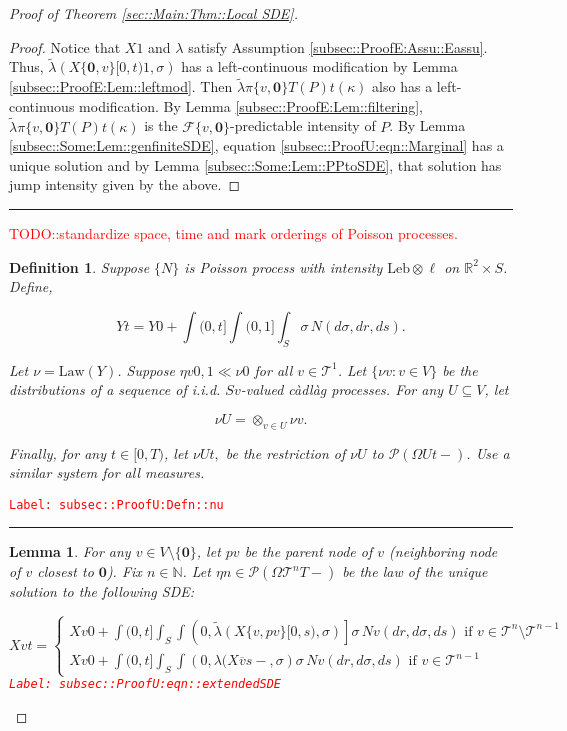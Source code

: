 \documentclass[12pt]{article}
\newcommand{\mb}{\mathbb}
\newcommand{\mc}{\mathcal}
\newcommand{\ov}{\overline}
\newcommand{\te}{\text}
\newcommand{\tr}{\textcolor{red}}
\newcommand{\labe}[1]{\tr{\texttt{Label: #1}}}
\newcommand{\lin}{\rule{\linewidth}{0.4 pt}}
\newcommand{\pmsr}{\mc{P}}							%
\renewcommand{\root}{\mathbf{0}}				%
\renewcommand{\v}{v}							%
\renewcommand{\U}{U}							%
\renewcommand{\S}{S}							%
\newcommand{\s}{\sigma}							%
\newcommand{\T}{T}								%
\renewcommand{\t}{t}							%
\newcommand{\proj}{\pi}							%
\renewcommand{\tt}{s}							%
\newcommand{\F}{\mc{F}}							%
\newcommand{\X}{X}								%
\newcommand{\cl}{\ov}							%
\newcommand{\tree}{\mc{T}}						%
\newcommand{\sln}[1]{^{#1}}						%
\newcommand{\poiss}{N}							%
\newcommand{\leb}{\te{Leb}}						%
\newcommand{\Sm}{\ell}							%
\newcommand{\rate}{\lambda}						%
\renewcommand{\r}{r}							%
\newcommand{\alt}[1]{\widetilde{#1}}			%
\newcommand{\mm}{\nu}							%
\newcommand{\mmm}{\eta}							%
\newcommand{\law}{\te{Law}}						%
\newcommand{\XX}{Y}								%
\renewcommand{\mark}{\kappa}					%
\newcommand{\rp}{P}								%
\newcommand{\crate}{\alt{\lambda}}				%
\newcommand{\p}{p}								%
\newtheorem{lem}[thms]{Lemma}
\newtheorem{defn}[thms]{Definition}
\begin{document}
\begin{proof}[Proof of Theorem \ref{sec::Main:Thm::Local SDE}]
\begin{proof}
Notice that \(\X{}{}{1}\) and \(\rate{}\) satisfy Assumption \ref{subsec::ProofE:Assu::Eassu}. Thus, \(\crate{}{}(\X{\{\root,\v\}}{[0,\t)}{1},\s)\) has a left-continuous modification by Lemma \ref{subsec::ProofE:Lem::leftmod}. Then \(\crate{\proj{\{\v,\root\}}{\T}(\rp{})}{\t}(\mark{})\) also has a left-continuous modification. By Lemma \ref{subsec::ProofE:Lem::filtering}, \(\crate{\proj{\{\v,\root\}}{\T}(\rp{})}{\t}(\kappa)\) is the \(\F{\{\v,\root\}}{}\)-predictable intensity of \(\rp{}\). By Lemma \ref{subsec::Some:Lem::genfiniteSDE}, equation \eqref{subsec::ProofU:eqn::Marginal} has a unique solution and by Lemma \ref{subsec::Some:Lem::PPtoSDE}, that solution has jump intensity given by the above.

\end{proof}

\lin

\tr{TODO::standardize space, time and mark orderings of Poisson processes.}

\begin{defn}
Suppose \(\{\poiss{}\}\) is Poisson process with intensity \(\leb\otimes \Sm\) on \(\mb{R}^2\times \S\). Define,

\[\XX{}{\t} = \XX{}{0} + \int{(0,\t]}\int{(0,1]}\int_\S\s\,\poiss{}(d\s,d\r,d\tt).\]

Let \(\mm{}{}{} = \law(\XX{}{})\). Suppose \(\mmm{\v}{0,}{1}\ll\mm{}{0}{}\) for all \(\v\in\tree\sln{1}\). Let \(\{\mm{\v}{}{}:\v\in V\}\) be the distributions of a sequence of i.i.d. \(\S{\v}\)-valued c\`adl\`ag processes. For any \(\U\subseteq V\), let 

\[\mm{\U}{}{} = \otimes_{\v\in\U} \mm{\v}{}{}.\]

Finally, for any \(\t\in [0,\T)\), let \(\mm{\U}{\t,}{}\) be the restriction of \(\mm{\U}{}{}\) to \(\pmsr(\Omega{\U}{\t-})\). Use a similar system for all measures.
\label{subsec::ProofU:Defn::nu}
\end{defn}
\labe{subsec::ProofU:Defn::nu}

\lin

\begin{lem}
For any \(\v \in V\setminus\{\root\}\), let \(\p{\v}\) be the parent node of \(\v\) (neighboring node of \(\v\) closest to \(\root\)). Fix \(n \in \mb{N}\). Let \(\mmm{}{}{n} \in \pmsr\left(\Omega{\tree\sln{n}}{\T-}\right)\) be the law of the unique solution to the following SDE:

\begin{equation}
\X{\v}{\t} = \begin{cases}
\X{\v}{0} + \int{(0,\t]}\int_\S\int{\left(0,\crate{}{}(\X{\{\v,\p{\v}\}}{[0,\tt)},\s)\right]}\s\,\poiss{\v}(d\r,d\s,d\tt)\te{ if } \v \in \tree\sln{n}\setminus \tree\sln{n-1}\\
\X{\v}{0} + \int{(0,\t]}\int_\S\int{\left(0,\rate{}(\X{\cl{\v}}{\tt-},\s\right)}\s\,\poiss{\v}(d\r,d\s,d\tt)\te{ if } \v \in \tree\sln{n-1}
\end{cases}
\label{subsec::ProofU:eqn::extendedSDE}
\end{equation}
\labe{subsec::ProofU:eqn::extendedSDE}


\end{lem}
\end{proof}
\end{document}
